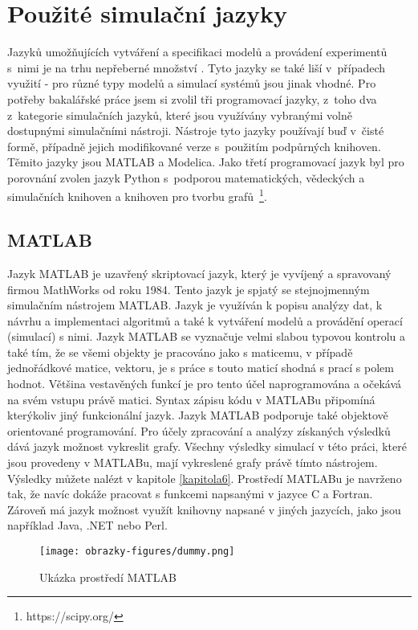 \section{Použité simulační jazyky}
Jazyků umožňujících vytváření a specifikaci modelů a provádení experimentů s~nimi je na trhu nepřeberné množství \cite{list-of-process-modelling-lang}. Tyto jazyky se také liší v~případech využití - pro různé typy modelů a simulací systémů jsou jinak vhodné. Pro potřeby bakalářské práce jsem si zvolil tři programovací jazyky, z~toho dva z~kategorie simulačních jazyků, které jsou využívány vybranými volně dostupnými simulačními nástroji. Nástroje tyto jazyky používají buď v~čisté formě, případně jejich modifikované verze s~použitím podpůrných knihoven. Těmito jazyky jsou MATLAB a Modelica. Jako třetí programovací jazyk byl pro porovnání zvolen jazyk Python s~podporou matematických, vědeckých a simulačních knihoven a knihoven pro tvorbu grafů~\footnote{https://scipy.org/}.

\subsection{MATLAB}
Jazyk MATLAB je uzavřený skriptovací jazyk, který je vyvíjený a spravovaný firmou MathWorks od roku 1984. Tento jazyk je spjatý se stejnojmenným simulačním nástrojem MATLAB. Jazyk je využíván k popisu analýzy dat, k návrhu a implementaci algoritmů a také k vytváření modelů a provádění operací (simulací) s nimi. Jazyk MATLAB se vyznačuje velmi slabou typovou kontrolu a také tím, že se všemi objekty je pracováno jako s maticemu, v případě jednořádkové matice, vektoru, je s práce s touto maticí shodná s prací s polem hodnot. Většina vestavěných funkcí je pro tento účel naprogramována a očekává na svém vstupu právě matici. Syntax zápisu kódu v MATLABu připomíná kterýkoliv jiný funkcionální jazyk. Jazyk MATLAB podporuje také objektově orientované programování. Pro účely zpracování a analýzy získaných výsledků dává jazyk možnost vykreslit grafy. Všechny výsledky simulací v této práci, které jsou provedeny v MATLABu, mají vykreslené grafy právě tímto nástrojem. Výsledky můžete nalézt v kapitole \ref{kapitola6}. Prostředí MATLABu je navrženo tak, že navíc dokáže pracovat s funkcemi napsanými v jazyce C a Fortran. Zároveň má jazyk možnost využít knihovny napsané v jiných jazycích, jako jsou například Java, .NET nebo Perl.
\begin{figure}
    \centering
    \texttt{[image: obrazky-figures/dummy.png]}
    \caption{Ukázka prostředí MATLAB}
    \label{fig:matlab}
\end{figure}

